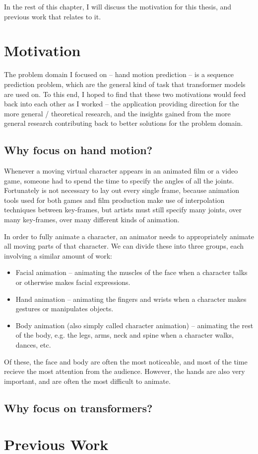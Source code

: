 

In the rest of this chapter, I will discuss the motivation for this thesis, and previous work that relates to it.

\section{Motivation}
\label{s:motivation}
The problem domain I focused on -- hand motion prediction -- is a sequence prediction problem, which are  the general kind of task that transformer models are used on. To this end, I hoped to find that these two motivations would feed back into each other as I worked -- the application providing direction for the more general / theoretical research, and the insights gained from the more general research contributing back to better solutions for the problem domain.

\subsection{Why focus on hand motion?}
\label{ss:why-hand-motion}

Whenever a moving virtual character appears in an animated film or a video game, someone had to spend the time to specify the angles of all the joints. Fortunately is not necessary to lay out every single frame, because animation tools used for both games and film production make use of interpolation techniques between key-frames, but artists must still specify many joints, over many key-frames, over many different kinds of animation.

In order to fully animate a character, an animator needs to appropriately animate all moving parts of that character. We can divide these into three groups, each involving a similar amount of work:
\begin{itemize}
    \item Facial animation -- animating the muscles of the face when a character talks or otherwise makes facial expressions.
    \item Hand animation -- animating the fingers and wrists when a character makes gestures or manipulates objects.
    \item Body animation (also simply called character animation) -- animating the rest of the body, e.g. the legs, arms, neck and spine when a character walks, dances, etc.
\end{itemize}

Of these, the face and body are often the most noticeable, and most of the time recieve the most attention from the audience. However, the hands are also very important, and are often the most difficult to animate.


\subsection{Why focus on transformers?}
\label{ss:why-transformers}


\section{Previous Work}
